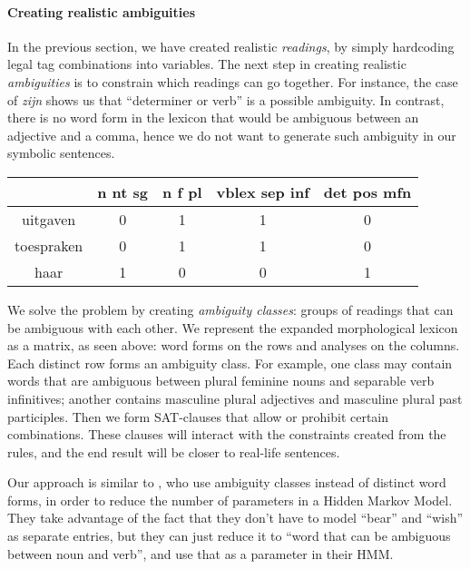 {{%


\paragraph{Creating realistic ambiguities}




In the previous section, we have created realistic \emph{readings}, by simply hardcoding legal tag combinations into variables. The next step in creating realistic \emph{ambiguities} is to constrain which readings can go together. For instance, the case of \emph{zijn} shows us that ``determiner or verb'' is a possible ambiguity. In contrast, there is no word form in the lexicon that would be ambiguous between an adjective and a comma, hence we do not want to generate such ambiguity in our symbolic sentences.

\begin{center}
\begin{tabular}{c|c|c|c|c}


            & n nt sg  & n f pl  & vblex sep inf & det pos mfn  \\ \hline
uitgaven    & 0        & 1       & 1             & 0    \\ 
toespraken  & 0        & 1       & 1             & 0    \\ 
haar        & 1        & 0       & 0             & 1    \\ 


\end{tabular}
\end{center}

We solve the problem by creating \emph{ambiguity classes}: groups of readings that can be ambiguous with each other. 
We represent the expanded morphological lexicon as a matrix, as seen
above: word forms on the rows and analyses on the columns. Each
distinct row forms an ambiguity class. For example, one class may
contain words that are ambiguous between plural feminine nouns and
separable verb infinitives; another contains masculine plural adjectives 
and masculine plural past participles.
Then we form SAT-clauses that allow or prohibit certain combinations. These clauses will interact with the constraints created from the rules, and the end result will be closer to real-life sentences.

Our approach is similar to , who use ambiguity classes instead of distinct word forms, in order to reduce the number of parameters in a Hidden Markov Model. They take advantage of the fact that they don't have to model ``bear'' and ``wish'' as separate entries, but they can just reduce it to ``word that can be ambiguous between noun and verb'', and use that as a parameter in their HMM. 

}}
